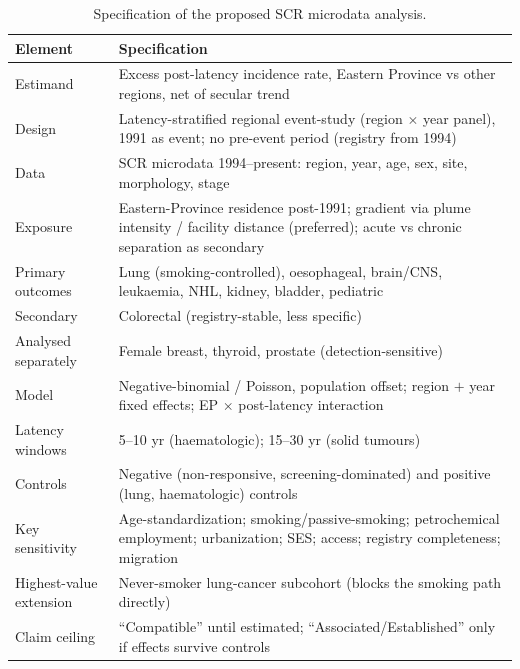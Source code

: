 \documentclass[3p,times]{elsarticle}
\begin{document}
\begin{table}[tbp]
\centering
\caption{Specification of the proposed SCR microdata analysis.}
\label{tab:study}
\footnotesize
\begin{tabular}{@{}L{0.28\columnwidth}L{0.64\columnwidth}@{}}
\toprule
Element & Specification \\
\midrule
Estimand & Excess post-latency incidence rate, Eastern Province vs other regions, net of secular trend \\
Design & Latency-stratified regional event-study (region $\times$ year panel), 1991 as event; no pre-event period (registry from 1994) \\
Data & SCR microdata 1994--present: region, year, age, sex, site, morphology, stage \\
Exposure & Eastern-Province residence post-1991; gradient via plume intensity / facility distance (preferred); acute vs chronic separation as secondary \\
Primary outcomes & Lung (smoking-controlled), oesophageal, brain/CNS, leukaemia, NHL, kidney, bladder, pediatric \\
Secondary & Colorectal (registry-stable, less specific) \\
Analysed separately & Female breast, thyroid, prostate (detection-sensitive) \\
Model & Negative-binomial / Poisson, population offset; region $+$ year fixed effects; EP $\times$ post-latency interaction \\
Latency windows & 5--10 yr (haematologic); 15--30 yr (solid tumours) \\
Controls & Negative (non-responsive, screening-dominated) and positive (lung, haematologic) controls \\
Key sensitivity & Age-standardization; smoking/passive-smoking; petrochemical employment; urbanization; SES; access; registry completeness; migration \\
Highest-value extension & Never-smoker lung-cancer subcohort (blocks the smoking path directly) \\
Claim ceiling & ``Compatible'' until estimated; ``Associated/Established'' only if effects survive controls \\
\bottomrule
\end{tabular}
\end{table}

\end{document}
